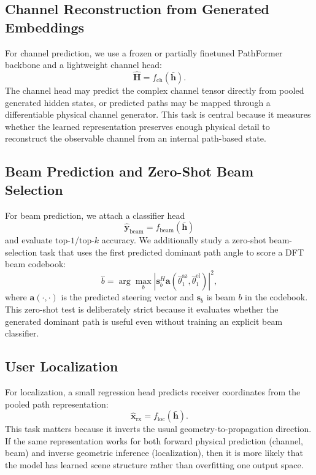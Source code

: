 \documentclass[11pt]{article}
\begin{document}
\subsection{Channel Reconstruction from Generated Embeddings}
For channel prediction, we use a frozen or partially finetuned PathFormer backbone and a lightweight channel head:
\begin{equation}
\hat{\mathbf{H}} = f_{\mathrm{ch}}(\bar{\mathbf{h}}).
\end{equation}
The channel head may predict the complex channel tensor directly from pooled generated hidden states, or predicted paths may be mapped through a differentiable physical channel generator. This task is central because it measures whether the learned representation preserves enough physical detail to reconstruct the observable channel from an internal path-based state.

\subsection{Beam Prediction and Zero-Shot Beam Selection}
For beam prediction, we attach a classifier head
\begin{equation}
\hat{\mathbf{y}}_{\mathrm{beam}} = f_{\mathrm{beam}}(\bar{\mathbf{h}})
\end{equation}
and evaluate top-$1$/top-$k$ accuracy. We additionally study a zero-shot beam-selection task that uses the first predicted dominant path angle to score a DFT beam codebook:
\begin{equation}
\hat{b}
=
\arg\max_{b}
\left|
\mathbf{s}_b^{H}
\mathbf{a}(\hat{\theta}^{\mathrm{az}}_1,\hat{\theta}^{\mathrm{el}}_1)
\right|^2,
\end{equation}
where $\mathbf{a}(\cdot,\cdot)$ is the predicted steering vector and $\mathbf{s}_b$ is beam $b$ in the codebook. This zero-shot test is deliberately strict because it evaluates whether the generated dominant path is useful even without training an explicit beam classifier.

\subsection{User Localization}
For localization, a small regression head predicts receiver coordinates from the pooled path representation:
\begin{equation}
\hat{\mathbf{x}}_{\mathrm{rx}} = f_{\mathrm{loc}}(\bar{\mathbf{h}}).
\end{equation}
This task matters because it inverts the usual geometry-to-propagation direction. If the same representation works for both forward physical prediction (channel, beam) and inverse geometric inference (localization), then it is more likely that the model has learned scene structure rather than overfitting one output space.
\end{document}
